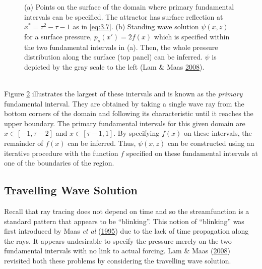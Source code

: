 \documentclass[a4paper]{article}
\numberwithin{equation}{section}
\begin{document}
\begin{figure}[h!]
\begin{subfigure}[t]{.5\textwidth}
  \label{fig:sub2}
  \caption{}
\end{subfigure}
\caption{(a) Points on the surface of the domain where primary fundamental intervals can be specified. The attractor has surface reflection at $x^* = \tau^2 - \tau - 1$ as in \eqref{eq:3.7}. (b) Standing wave solution $\psi(x, z)$ for a surface pressure, $p_s(x') = 2f(x)$ which is specified within the two fundamental intervals in (a). Then, the whole pressure distribution along the surface (top panel) can be inferred. $\psi$ is depicted by the gray scale to the left (Lam \& Maas \protect\hyperlink{ref 18}{2008}).}
\label{fig:7}
\end{figure}\\
Figure \ref{fig:7} illustrates the largest of these intervals and is known as the \emph{primary} fundamental interval. They are obtained by taking a single wave ray from the bottom corners of the domain and following its characteristic until it reaches the upper boundary. The primary fundamental intervals for this given domain are $x \in [-1,\tau-2]$ and $x \in [\tau -1, 1]$. By specifying $f(x)$ on these intervals, the remainder of $f(x)$ can be inferred. Thus, $\psi(x,z)$ can be constructed using an iterative procedure with the function $f$ specified on these fundamental intervals at one of the boundaries of the region. 

\subsection{Travelling Wave Solution}
Recall that ray tracing does not depend on time and so the streamfunction is a standard pattern that appears to be “blinking”. This notion of “blinking” was first introduced by Maas \emph{et al} (\hyperlink{ref 17}{1995}) due to the lack of time propagation along the rays. It appears undesirable to specify the pressure merely on the two fundamental intervals with no link to actual forcing. Lam \& Maas (\hyperlink{ref 18}{2008}) revisited both these problems by considering the travelling wave solution.
\end{document}
